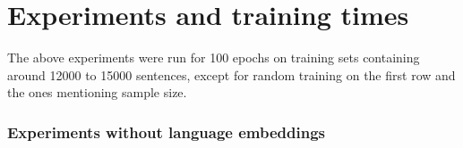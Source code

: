 \section{Experiments and training times} \label{experiments_time_appendix}

The above experiments were run for 100 epochs on training sets containing
around 12000 to 15000 sentences, except for random training on the first row
and the ones mentioning sample size.

\subsubsection{Experiments without language embeddings}
\begin{table}[ht]
    \begin{center}
        \caption{Training duration without language embeddings}
        \label{table:experiments_durations_noem}
    \end{center}
\end{table}

